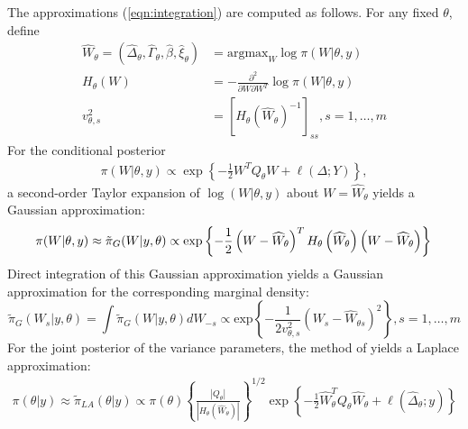 \documentclass[ba]{imsart}
\begin{document}
The approximations (\ref{eqn:integration}) are computed as follows. For any fixed $\theta$, define
\begin{equation}\begin{aligned}\label{eqn:modeandhessian}
\widehat{W}_{\theta} = \left( \widehat{\Delta}_{\theta},\widehat{\Gamma}_{\theta},\widehat{\beta},\widehat{\xi}_{\theta}\right) &= \text{argmax}_{W}\log\pi(W|\theta,y) \\ 
H_{\theta}(W) &= -\frac{\partial^{2}}{\partial W \partial W^{T}}\log\pi(W|\theta,y) \\
v_{\theta,s}^{2} &= \left[H_\theta \left(\widehat{W}_{\theta}\right) ^ {-1} \right]_{ss}, s = 1,\ldots,m
\end{aligned}\end{equation}
For the conditional posterior
\begin{equation}\begin{aligned}\label{eqn:condpost}
\pi(W|\theta,y) \propto \exp\left\lbrace -\frac{1}{2}W^{T}Q_{\theta}W + \ell\left(\Delta;Y\right)\right\rbrace,
\end{aligned}\end{equation}
a second-order Taylor expansion of $\log(W|\theta,y)$ about $W = \widehat{W}_{\theta}$ yields a Gaussian approximation:
\begin{equation}\label{eqn:gaussianapprox}
\pi(W|\theta,y) \approx \tilde{\pi}_{G}(W|y,\theta) \propto \text{exp}\left\{-\frac{1}{2} \left(W-\widehat{W}_{\theta} \right)^T H_\theta\left(\widehat{W}_{\theta}\right) \left(W-\widehat{W}_{\theta} \right) \right\} \\
\end{equation}
Direct integration of this Gaussian approximation yields a Gaussian approximation for the corresponding marginal density:
\begin{equation}\label{eqb:marginalgaussianapprox}
\tilde{\pi}_{G}(W_{s}|y,\theta) = \int\tilde{\pi}_{G}(W|y,\theta)dW_{-s} \propto\text{exp}\left\{-\frac{1}{2v_{\theta,s}^{2}} \left(W_s-\widehat{W}_{\theta s} \right)^2 \right\}, s = 1,\ldots,m
\end{equation}
For the joint posterior of the variance parameters, the method of \cite{tierney} yields a Laplace approximation:
\begin{equation}\begin{aligned}\label{eqn:laplace}
\pi(\theta|y) \approx \tilde{\pi}_{LA}(\theta|y) \propto \pi(\theta)\left\{\frac{\left|Q_{\theta}\right|}{\left|H_{\theta}\left(\widehat{W}_{\theta}\right)\right|}\right\}^{1/2}\exp\left\{ -\frac{1}{2}\widehat{W}_{\theta}^{T}Q_{\theta}\widehat{W}_{\theta} + \ell\left(\widehat{\Delta}_{\theta};y \right)\right\}
\end{aligned}\end{equation}
\end{document}
